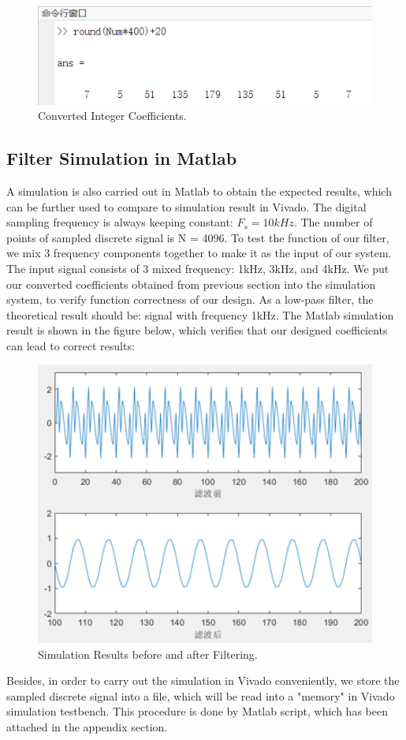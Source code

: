 \documentclass[a4paper]{article}
\begin{document}
\begin{figure}[H]
    \centering
    \includegraphics[width=1\textwidth]{part2_3.png}
    \caption{Converted Integer Coefficients.}
\end{figure}

\subsection{Filter Simulation in Matlab}
A simulation is also carried out in Matlab to obtain the expected results, which can be further used to compare to simulation result in Vivado. The digital sampling frequency is always keeping constant: $F_s = 10kHz$. The number of points of sampled discrete signal is N = 4096. To test the function of our filter, we mix 3 frequency components together to make it as the input of our system. The input signal consists of 3 mixed frequency: 1kHz, 3kHz, and 4kHz. We put our converted coefficients obtained from previous section into the simulation system, to verify function correctness of our design. As a low-pass filter, the theoretical result should be: signal with frequency 1kHz. The Matlab simulation result is shown in the figure below, which verifies that our designed coefficients can lead to correct results:
\begin{figure}[H]
    \centering
    \includegraphics[width=1\textwidth]{part2_4.png}
    \caption{Simulation Results before and after Filtering.}
\end{figure}
Besides, in order to carry out the simulation in Vivado conveniently, we store the sampled discrete signal into a file, which will be read into a "memory" in Vivado simulation testbench. This procedure is done by Matlab script, which has been attached in the appendix section.
\end{document}
